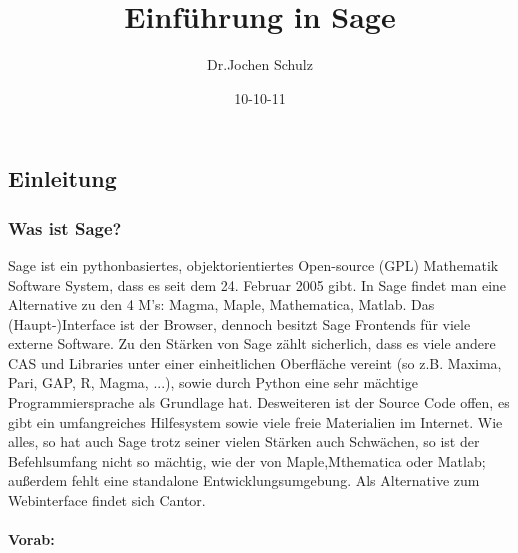 \documentclass[fontsize=12pt,paper=a4,twoside,bibtotoc,idxtotoc,
liststotoc,pagesize,BCOR1.2cm,DIV15,chapterprefix,pagesize=pdftex]{scrbook}
\title{Einführung in Sage}
\author{Dr.Jochen Schulz}
\date{10-10-11}
\begin{document}
\maketitle
\tableofcontents

\chapter{}
\section{Einleitung}
\subsection{Was ist Sage?}

Sage ist ein pythonbasiertes, objektorientiertes Open-source (GPL) Mathematik Software System, dass es seit dem 24. Februar 2005 gibt.
In Sage findet man eine Alternative zu den 4 M's: Magma, Maple, Mathematica, Matlab.\newline
Das (Haupt-)Interface ist der Browser, dennoch besitzt Sage Frontends für viele externe Software.\newline
Zu den Stärken von Sage zählt sicherlich, dass es viele andere CAS und Libraries unter einer einheitlichen Oberfl\"ache vereint 
(so z.B. Maxima, Pari, GAP, R, Magma, ...), sowie durch Python eine sehr mächtige Programmiersprache als Grundlage hat. Desweiteren 
ist der Source Code offen, es gibt ein umfangreiches Hilfesystem sowie viele freie Materialien im Internet.\newline
Wie alles, so hat auch Sage trotz seiner vielen Stärken auch Schwächen, so ist der Befehlsumfang nicht so mächtig, wie der von Maple,Mthematica 
oder Matlab; außerdem fehlt eine standalone Entwicklungsumgebung. Als Alternative zum Webinterface findet sich Cantor.

\subsubsection{Vorab:}
\end{document}
